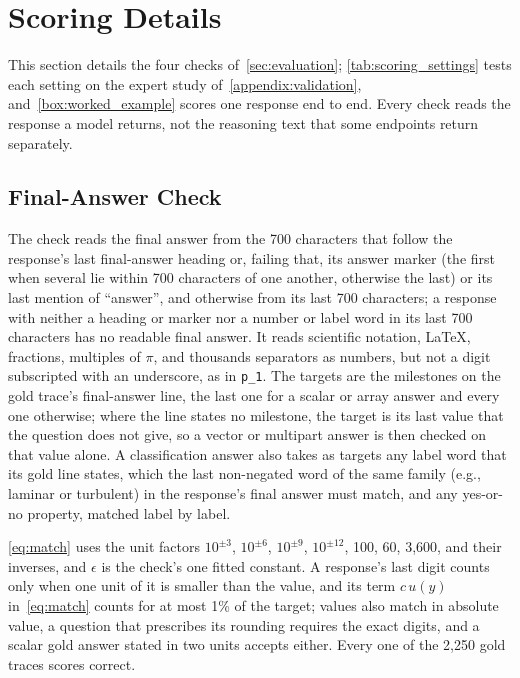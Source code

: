 \section{Scoring Details}
\label{appendix:scoring}

This section details the four checks of~\autoref{sec:evaluation};
\autoref{tab:scoring_settings} tests each setting on the expert study
of~\autoref{appendix:validation}, and~\autoref{box:worked_example} scores one response end to end.
Every check reads the response a model returns, not the reasoning text that some endpoints return
separately.

\subsection{Final-Answer Check}

The check reads the final answer from the 700 characters that follow the response's last
final-answer heading or, failing that, its answer marker (the first when several lie within 700
characters of one another, otherwise the last) or its last mention of ``answer'', and otherwise
from its last 700 characters; a response with neither a heading or marker nor a number or label
word in its last 700 characters has no readable final answer.
It reads scientific notation, LaTeX, fractions, multiples of $\pi$, and thousands separators as
numbers, but not a digit subscripted with an underscore, as in \texttt{p\_1}.
The targets are the milestones on the gold trace's final-answer line, the last one for a scalar or
array answer and every one otherwise; where the line states no milestone, the target is its last
value that the question does not give, so a vector or multipart answer is then checked on that
value alone.
A classification answer also takes as targets any label word that its gold line states, which the
last non-negated word of the same family (e.g., laminar or turbulent) in the response's final answer
must match, and any yes-or-no property, matched label by label.

\autoref{eq:match} uses the unit factors $10^{\pm 3}$, $10^{\pm 6}$, $10^{\pm 9}$, $10^{\pm 12}$,
100, 60, 3,600, and their inverses, and $\epsilon$ is the check's one fitted constant.
A response's last digit counts only when one unit of it is smaller than the value, and its term
$c\,u(\hat{y})$ in~\autoref{eq:match} counts for at most 1\% of the target; values also match in
absolute value, a question that prescribes its rounding requires the exact digits, and a scalar gold
answer stated in two units accepts either.
Every one of the 2,250 gold traces scores correct.

